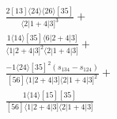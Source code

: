 \documentclass[varwidth, border=5pt]{standalone}
\begin{document}
\begin{my}
$\begin{gathered}
\scriptscriptstyle\frac{2[13]⟨24⟩⟨26⟩[35]}{⟨2|1+4|3]^3}+\\
\scriptscriptstyle\frac{1⟨14⟩[35]⟨6|2+4|3]}{⟨1|2+4|3]^2⟨2|1+4|3]}+\\
\scriptscriptstyle\frac{-1⟨24⟩[35]^2(s_{134}-s_{124})}{[56]⟨1|2+4|3]⟨2|1+4|3]^2}+\\
\scriptscriptstyle\frac{1⟨14⟩[15][35]}{[56]⟨1|2+4|3]⟨2|1+4|3]}\phantom{+}
\end{gathered}$
\end{my}
\end{document}
